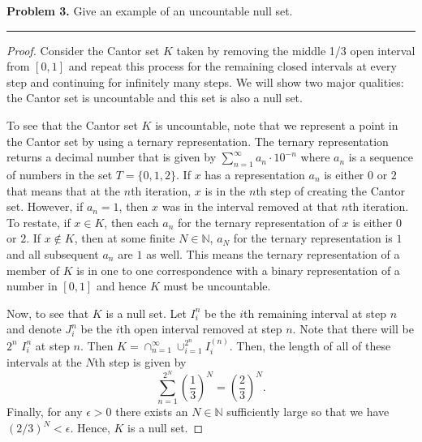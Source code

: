 \documentclass[leqno]{article}
\theoremstyle{nonumberplain}
\newtheorem{proof}{Proof}
\newcommand{\N}{\mathbb{N}}
\begin{document}
\pagebreak


\noindent\textbf{Problem 3.} \quad
Give an example of an uncountable null set.

\noindent\rule[0.5ex]{\linewidth}{1pt}

\begin{proof}
Consider the Cantor set $K$ taken by removing the middle 1/3 open interval from $[0,1]$ and repeat this process for the remaining closed intervals at every step and continuing for infinitely many steps.  We will show two major qualities: the Cantor set is uncountable and this set is also a null set.

To see that the Cantor set $K$ is uncountable, note that we represent a point in the Cantor set by using a ternary representation.  The ternary representation returns a decimal number that is given by $\sum_{n=1}^\infty a_n \cdot 10^{-n}$ where $a_n$ is a sequence of numbers in the set $T=\{0,1,2\}$. If $x$ has a representation $a_n$ is either $0$ or $2$ that means that at the $n$th iteration, $x$ is in the $n$th step of creating the Cantor set.  However, if $a_n=1$, then $x$ was in the interval removed at that $n$th iteration.  To restate, if $x\in K$, then each $a_n$ for the ternary representation of $x$ is either $0$ or $2$. If $x\notin K$, then at some finite $N\in \N$, $a_N$ for the ternary representation is $1$ and all subsequent $a_n$ are $1$ as well.  This means the ternary representation of a member of $K$ is in one to one correspondence with a binary representation of a number in $[0,1]$ and hence $K$ must be uncountable.

Now, to see that $K$ is a null set.  Let $I_i^{n}$ be the $i$th remaining interval at step $n$ and denote $J_i^{n}$ be the $i$th open interval removed at step $n$. Note that there will be $2^n$ $I_i^{n}$ at step $n$. Then $K=\cap_{n=1}^\infty \cup_{i=1}^{2^n} I_i^{(n)}$.   Then, the length of all of these intervals at the $N$th step is given by
\[
\sum_{n=1}^{2^N} \left( \frac{1}{3} \right)^N = \left( \frac{2}{3} \right)^N.
\]
Finally, for any $\epsilon>0$ there exists an $N\in \N$ sufficiently large so that we have $(2/3)^N<\epsilon$.  Hence, $K$ is a null set.
\end{proof}
\end{document}
